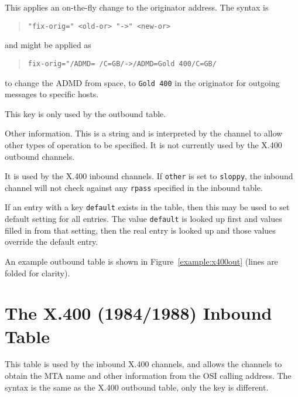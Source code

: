 \begin{describe}
\item[\verb|fix-orig|:] This applies an on-the-fly change to the
originator address. The syntax is
\begin{quote}\small\begin{verbatim}
"fix-orig=" <old-or> "->" <new-or>
\end{verbatim}\end{quote}
and might be applied as
\begin{quote}\small\begin{verbatim}
fix-orig="/ADMD= /C=GB/->/ADMD=Gold 400/C=GB/
\end{verbatim}\end{quote}
to change the ADMD from space, to \verb|Gold 400| in the originator
for outgoing messages to specific hosts.

This key is only used by the outbound table.

\item[\verb+other+:]	Other information. This is a string and is
interpreted by the channel to allow other types of operation to be
specified. It is not currently used by the X.400 outbound channels.

It is used by the X.400 inbound channels.
If \verb+other+ is set to \verb+sloppy+, the inbound channel will not
check against any \verb+rpass+ specified in the inbound table.

\end{describe}

If an entry with a key \verb|default| exists in the
table, then this may be used to set default setting for all entries.
The value \verb|default| is looked up first and values filled in from
that setting, then the real entry is looked up and those values
override the default entry.

An example outbound table is shown in Figure~\ref{example:x400out}
(lines are folded for clarity).


\section {The X.400 (1984/1988) Inbound Table}\label{tab:X.400(84)in}

This table is used by the inbound
X.400 channels, 
and allows the channels to obtain the MTA name and other information
from the OSI calling address. The syntax is the same as the X.400
outbound table, only the key is different.

